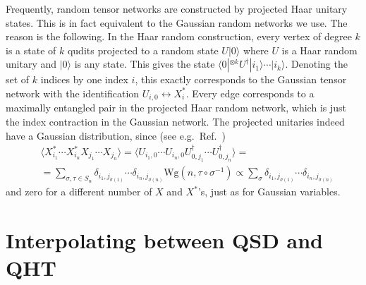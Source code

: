 \documentclass[a4paper,11pt]{article}
\begin{document}
Frequently, random tensor networks are constructed by projected Haar unitary states. This is in fact equivalent to the Gaussian random networks we use.
The reason is the following. In the Haar random construction, every vertex of degree $k$ is a state of $k$ qudits projected to a random state $U|0\rangle $ where $U$ is a Haar random unitary and $|0\rangle $ is any state. This gives the state $\langle 0|^{\otimes k} U^{\dagger}  |i_1\rangle \cdots |i_k\rangle $. Denoting the set of $k$ indices by one index $i$, this exactly corresponds to the Gaussian tensor network with the identification $U_{i,0} \leftrightarrow X^*_i$.
Every edge corresponds to a maximally entangled pair in the projected Haar random network, which is just the index contraction in the Gaussian network. The projected unitaries indeed have a Gaussian distribution, since (see e.g.~Ref.~\cite{2002math.ph...5010C})
\begin{equation}
\begin{split}
    & \langle X^*_{i_1} \cdots X^*_{i_n} X_{j_1} \cdots X_{j_n}\rangle =\langle U_{i_1,0} \cdots U_{i_n,0} U^{\dagger} _{0,j_1} \cdots U ^{\dagger} _{0,j_n}\rangle =\\
    &= \sum _{\sigma ,\tau \in S_n} \delta _{i_1,j_{\sigma(1)}} \cdots \delta _{i_n,j_{\sigma (n)}} \text{Wg}(n,\tau \circ \sigma ^{-1}) \propto \sum _{\sigma } \delta _{i_1,j_{\sigma(1)}} \cdots \delta _{i_n,j_{\sigma (n)}} 
\end{split}
\end{equation}
and zero for a different number of $X$ and $X^*$'s, just as for Gaussian variables.


\section{Interpolating between QSD and QHT}
\label{interp_app}
\end{document}
